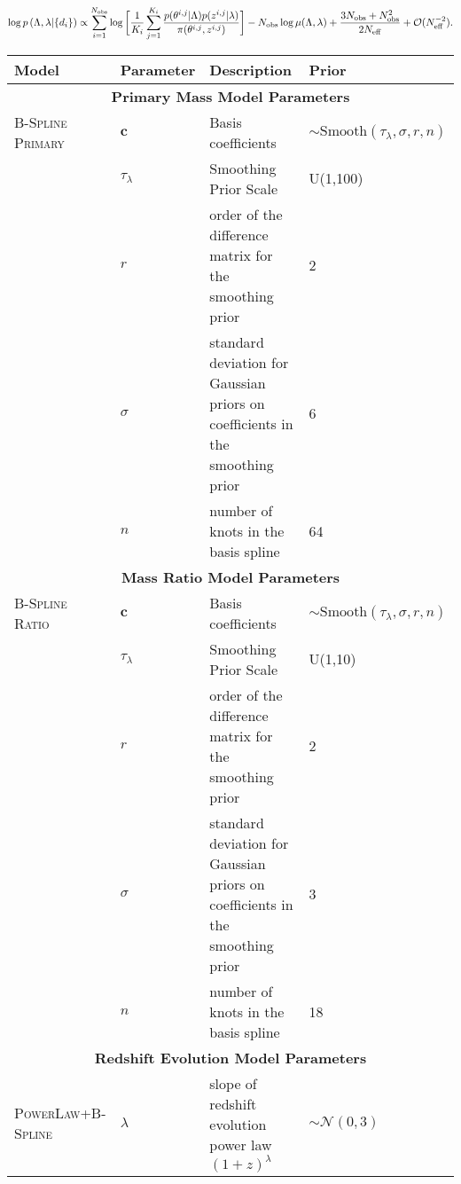 \begin{equation}\label{importance-posterior}
    \log p\left(\Lambda, \lambda | \{d_i\}\right) \propto \sum_{i=1}^{N_\mathrm{obs}} \log \bigg[ \frac{1}{K_i} \sum_{j=1}^{K_i} \frac{p(\theta^{i,j}|\Lambda)p(z^{i,j}|\lambda)}{\pi(\theta^{i,j}, z^{i,j})} \bigg] -  \\
    N_\mathrm{obs} \log \mu(\Lambda, \lambda) + \frac{3N_\mathrm{obs} + N_\mathrm{obs}^2}{2N_\mathrm{eff}} + \mathcal{O}(N_\mathrm{eff}^{-2}).
\end{equation}


\begin{table*}[hb!]
    \centering
    \begin{tabular}{|l|l|l|l|}
    \hline
    \textbf{Model} & \textbf{Parameter} & \textbf{Description} & \textbf{Prior} \\ \hline \hline
    \multicolumn{4}{|c|}{\textbf{Primary Mass Model Parameters}} \\ \hline
    \textsc{B-Spline Primary} & $\bm{c}$ & Basis coefficients & $\sim \mathrm{Smooth}(\tau_\lambda, \sigma, r, n)$ \\ \cline{2-4} 
     & $\tau_\lambda$ & Smoothing Prior Scale & U(1,100) \\ \cline{2-4}
     & $r$ & order of the difference matrix for the smoothing prior & 2 \\ \cline{2-4} 
     & $\sigma$ & standard deviation for Gaussian priors on coefficients in the smoothing prior & 6 \\ \cline{2-4} 
     & $n$ & number of knots in the basis spline & 64 \\ \hline \hline 
    \multicolumn{4}{|c|}{\textbf{Mass Ratio Model Parameters}} \\ \hline
    \textsc{B-Spline Ratio} & $\bm{c}$ & Basis coefficients & $\sim \mathrm{Smooth}(\tau_\lambda, \sigma, r, n)$ \\ \cline{2-4} 
     & $\tau_\lambda$ & Smoothing Prior Scale & U(1,10) \\ \cline{2-4}
     & $r$ & order of the difference matrix for the smoothing prior & 2 \\ \cline{2-4} 
     & $\sigma$ & standard deviation for Gaussian priors on coefficients in the smoothing prior & 3 \\ \cline{2-4} 
     & $n$ & number of knots in the basis spline & 18 \\ \hline \hline
    \multicolumn{4}{|c|}{\textbf{Redshift Evolution Model Parameters}} \\ \hline
    \textsc{PowerLaw+B-Spline} & $\lambda$ & slope of redshift evolution power law $(1+z)^\lambda$ &  $\sim \mathcal{N}(0,3)$ \\ \cline{2-4}

\end{tabular}
\end{table*}
